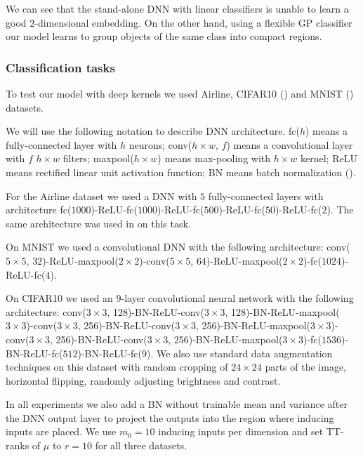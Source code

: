   We can see that the stand-alone DNN with linear classifiers is unable
  to learn a good $2$-dimensional embedding.
  On the other hand, using a flexible GP classifier our
  model learns to group objects of the same class into compact regions.


  \subsubsection{Classification tasks}
  
  To test our model with deep kernels we used Airline,
  CIFAR10 (\citet{krizhevsky2009}) and
  MNIST (\citet{lecun1998}) datasets.

  We will use the following notation to describe DNN architecture. fc($h$) means
  a fully-connected layer with $h$ neurons; conv($h{\times}w$, $f$) means a 
  convolutional layer with $f$ $h{\times}w$ filters; maxpool($h{\times}w$) means
  max-pooling with $h{\times}w$ kernel; ReLU means rectified linear unit 
  activation function; BN means batch normalization (\citet{ioffe2015}).

  For the Airline dataset we used a DNN with $5$ fully-connected layers 
  with architecture
  fc($1000$)-ReLU-fc($1000$)-ReLU-fc($500$)-ReLU-fc($50$)-ReLU-fc($2$).
  The same 
  architecture was used in \citet{wilson2016stochastic} on this task. 
  
  On MNIST we used a convolutional DNN with the following architecture:
  conv($5{\times}5$, $32$)-ReLU-maxpool($2{\times}2$)-conv($5{\times}5$, $64$)-ReLU-maxpool($2{\times}2$)-fc($1024$)-ReLU-fc($4$).

  On CIFAR10 we used an $9$-layer convolutional neural network with the
  following architecture: 
  conv($3{\times}3$, 128)-BN-ReLU-conv($3{\times}3$, 128)-BN-ReLU-maxpool($3{\times}3$)-conv($3{\times}3$, 256)-BN-ReLU-conv($3{\times}3$, 256)-BN-ReLU-maxpool($3{\times}3$)-conv($3{\times}3$, 256)-BN-ReLU-conv($3{\times}3$, 256)-BN-ReLU-maxpool($3{\times}3$)-fc($1536$)-BN-ReLU-fc($512$)-BN-ReLU-fc($9$).
  We also use standard data augmentation
  techniques on this dataset with random cropping of $24 \times 24$
  parts  of the image, horizontal flipping, randomly adjusting brightness
  and contrast.

  In all experiments we also add a BN without trainable mean and 
  variance after the DNN output layer to project the outputs into the region
  where inducing inputs are placed. We use $m_0 = 10$ inducing inputs
  per dimension and set TT-ranks of $\mu$ to $r = 10$ for all three datasets.
  

